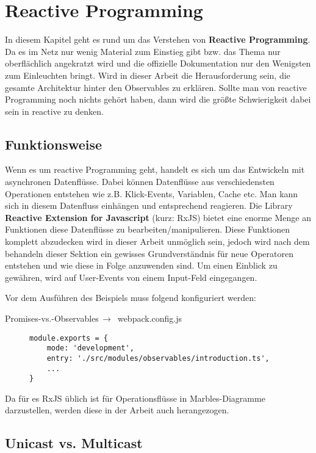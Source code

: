 \section{Reactive Programming}
In diesem Kapitel geht es rund um das Verstehen von \textbf{Reactive Programming}. Da es im Netz nur wenig Material zum Einstieg gibt bzw. das Thema nur oberflächlich angekratzt wird und die offizielle Dokumentation nur den Wenigsten zum Einleuchten bringt. Wird in dieser Arbeit die Herausforderung sein, die gesamte Architektur hinter den Observables zu erklären.
Sollte man von reactive Programming noch nichts gehört haben, dann wird die größte Schwierigkeit dabei sein in \glqq{}reactive\grqq{} zu denken.

\subsection{Funktionsweise}
Wenn es um reactive Programming geht, handelt es sich um das Entwickeln mit asynchronen Datenflüsse. Dabei können Datenflüsse aus verschiedensten Operationen entstehen wie z.B. Klick-Events, Variablen, Cache etc. Man kann sich in diesem Datenfluss einhängen und entsprechend reagieren. Die Library \textbf{Reactive Extension for Javascript} (kurz: RxJS) bietet eine enorme Menge an Funktionen diese Datenflüsse zu bearbeiten/manipulieren. Diese Funktionen komplett abzudecken wird in dieser Arbeit unmöglich sein, jedoch wird nach dem behandeln dieser Sektion ein gewisses Grundverständnis für neue Operatoren entstehen und wie diese in Folge anzuwenden sind. Um einen Einblick zu gewähren, wird auf User-Events von einem Input-Feld eingegangen.

\noindent
Vor dem Ausführen des Beispiels muss folgend konfiguriert werden:

 \begin{center}
     Promises-vs.-Observables$\,\to\,$ webpack.config.js
 \end{center}

\begin{figure}[H]
\begin{lstlisting}
module.exports = {
    mode: 'development',
    entry: './src/modules/observables/introduction.ts',
    ...
}
\end{lstlisting}
\end{figure}

Da für es RxJS üblich ist für Operationsflüsse in Marbles-Diagramme darzustellen, werden diese in der Arbeit auch herangezogen.

\subsection{Unicast vs. Multicast}
